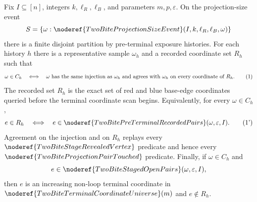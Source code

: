 \begin{helper}
Fix \(I\subseteq[n]\), integers \(k,\ell_R,\ell_B\), and parameters
\(m,p,\varepsilon\).  On the projection-size event
\[
S=\{\omega:
\noderef{TwoBiteProjectionSizeEvent}(I,k,\ell_R,\ell_B,\omega)\}
\]
there is a finite disjoint partition by pre-terminal exposure histories.  For
each history \(h\) there is a representative sample \(\omega_h\) and a
recorded coordinate set \(R_h\) such that
\[
\omega\in C_h
\quad\Longleftrightarrow\quad
\omega\hbox{ has the same injection as }\omega_h
\hbox{ and agrees with }\omega_h\hbox{ on every coordinate of }R_h.
\tag{1}
\]
The recorded set \(R_h\) is the exact set of red and blue base-edge
coordinates queried before the terminal coordinate scan begins.  Equivalently,
for every \(\omega\in C_h\),
\[
e\in R_h
\quad\Longleftrightarrow\quad
e\in\noderef{TwoBitePreTerminalRecordedPairs}(\omega,\varepsilon,I).
\tag{1'}
\]
Agreement on the injection and on \(R_h\) replays every
\(\noderef{TwoBiteStageRevealedVertex}\) predicate and hence every
\(\noderef{TwoBiteProjectionPairTouched}\) predicate.  Finally, if
\(\omega\in C_h\) and
\[
e\in\noderef{TwoBiteStagedOpenPairs}(\omega,\varepsilon,I),
\]
then \(e\) is an increasing non-loop terminal coordinate in
\(\noderef{TwoBiteTerminalCoordinateUniverse}(m)\) and \(e\notin R_h\).
\end{helper}
